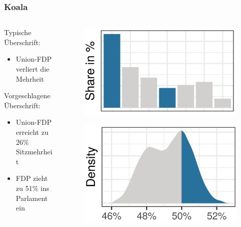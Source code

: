 \documentclass[aspectratio=169,xcolor=dvipsnames]{beamer}
\begin{document}
\begin{frame}
	\frametitle{Koala}
	\begin{columns}
		\begin{column}{0.4\textwidth}
			Typische Überschrift:
			\begin{itemize}
				\item \glqq Union-FDP verliert die Mehrheit\grqq{}
			\end{itemize}

			\vspace{1cm}
			Vorgeschlagene Überschrift:
			\begin{itemize}
				\item \glqq Union-FDP erreicht zu 26\% Sitzmehrheit \grqq{}
				\item \glqq FDP zieht zu 51\% ins Parlament ein \grqq{}
			\end{itemize}
			
		\end{column}
		\begin{column}{0.6\textwidth}
			\begin{figure}
				\includegraphics[height=0.35\textheight]{partyshare}
			\end{figure}
			\begin{figure}
				\includegraphics[height=0.40\textheight]{poe}
			\end{figure}
		\end{column}
	\end{columns}
\end{frame}
\end{document}
